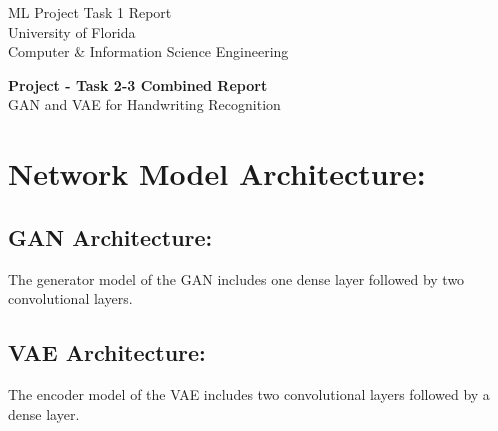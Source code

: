 \documentclass[11pt,usenames]{article}
\title{}
\date{}
\begin{document}
	
	
	\begin{center}
		{\sc ML Project Task 1 Report}\\
		University of Florida \\
		Computer \& Information Science Engineering
		\vspace{0.5 cm}
	\end{center}
	
	{\large \begin{center}
			\textbf{Project - Task 2-3 Combined Report}\\
			GAN and VAE for Handwriting Recognition
	\end{center}}
	
	
	
	
	
	
	\newpage
	
	
	\section{Network Model Architecture:}\label{section:NetworkModelArchitecture}

	\subsection{GAN Architecture:}\label{subsection:GAN_NetworkModelArchitecture}
	The generator model of the GAN includes one dense layer followed by two convolutional layers.
	
	\subsection{VAE Architecture:}\label{subsection:VAE_NetworkModelArchitecture}
	The encoder model of the VAE includes two convolutional layers followed by a dense layer.	
	
\end{document}
